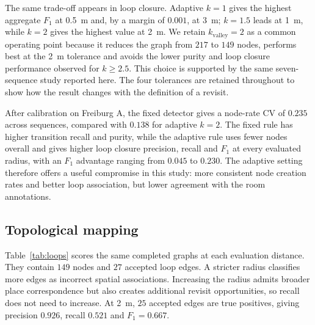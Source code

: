 \documentclass[5p,twocolumn,nonatbib,reversenotenum]{elsarticle}
\begin{document}
The same trade-off appears in loop closure. Adaptive $k=1$ gives the highest aggregate $F_1$ at \qty{0.5}{\metre} and, by a margin of $0.001$, at \qty{3}{\metre}; $k=1.5$ leads at \qty{1}{\metre}, while $k=2$ gives the highest value at \qty{2}{\metre}. We retain $k_{\mathrm{valley}}=2$ as a common operating point because it reduces the graph from $217$ to $149$ nodes, performs best at the \qty{2}{\metre} tolerance and avoids the lower purity and loop closure performance observed for $k\geq2.5$. This choice is supported by the same seven-sequence study reported here. The four tolerances are retained throughout to show how the result changes with the definition of a revisit.

After calibration on Freiburg A, the fixed detector gives a node-rate CV of $0.235$ across sequences, compared with $0.138$ for adaptive $k=2$. The fixed rule has higher transition recall and purity, while the adaptive rule uses fewer nodes overall and gives higher loop closure precision, recall and $F_1$ at every evaluated radius, with an $F_1$ advantage ranging from $0.045$ to $0.230$. The adaptive setting therefore offers a useful compromise in this study: more consistent node creation rates and better loop association, but lower agreement with the room annotations.

\subsection{Topological mapping}
Table~\ref{tab:loops} scores the same completed graphs at each evaluation distance. They contain $149$ nodes and $27$ accepted loop edges. A stricter radius classifies more edges as incorrect spatial associations. Increasing the radius admits broader place correspondence but also creates additional revisit opportunities, so recall does not need to increase. At \qty{2}{\metre}, $25$ accepted edges are true positives, giving precision $0.926$, recall $0.521$ and $F_1=0.667$.
\end{document}
